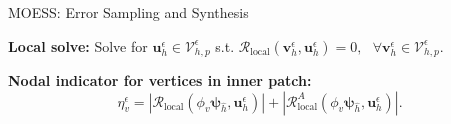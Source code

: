 \documentclass{beamer}
\newcounter{sectionframecount}
\begin{document}
\begin{frame}[t]{MOESS: Error Sampling and Synthesis}

{
\textbf{Local solve:} Solve for $\boldsymbol{u}_h^\epsilon \in \mathcal{V}_{h,p}^\epsilon$ s.t. $\mathcal{R}_{\text{local}}(\boldsymbol{v}_h^\epsilon,\boldsymbol{u}_h^\epsilon) = 0,~~~\forall \boldsymbol{v}_h^\epsilon \in \mathcal{V}_{h,p}^\epsilon$.
}


{
\vspace{4.7cm}
\textbf{Nodal indicator for vertices in inner patch:}
\begin{equation}
  \eta_v^\epsilon = |\mathcal{R}_\text{local}(\phi_v \boldsymbol{\psi}_{\hat{h}},\boldsymbol{u}_h^\epsilon)| + |\mathcal{R}_\text{local}^A(\phi_v\boldsymbol{\psi}_{\hat{h}},\boldsymbol{u}^\epsilon_h)|.
  \label{e:dwr_ind_base_local}
\end{equation}
}

\end{frame}

\end{document}
